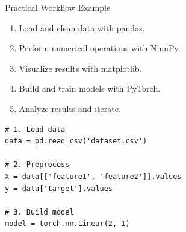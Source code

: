 \documentclass{beamer}
\begin{document}
	\begin{frame}[fragile]{Practical Workflow Example}
		\begin{enumerate}
			\item Load and clean data with pandas.
			\item Perform numerical operations with NumPy.
			\item Visualize results with matplotlib.
			\item Build and train models with PyTorch.
			\item Analyze results and iterate.
		\end{enumerate}
		
		\begin{example}[AI workflow]
			\begin{lstlisting}
# 1. Load data
data = pd.read_csv('dataset.csv')

# 2. Preprocess
X = data[['feature1', 'feature2']].values
y = data['target'].values

# 3. Build model
model = torch.nn.Linear(2, 1)
			\end{lstlisting}
		\end{example}
	\end{frame}
\end{document}
